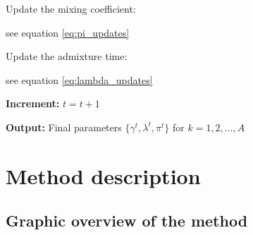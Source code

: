 \begin{algorithm}
\begin{algorithmic}[1]
        \State Update the mixing coefficient:
        
        \hspace{7mm} see equation \ref{eq:pi_updates}
        
        \State Update the admixture time:
        
        \hspace{7mm} see equation \ref{eq:lambda_updates}
            
    \EndFor
    

    \State \textbf{Increment:} $t = t + 1$
    

\State \textbf{Output:} Final parameters $\{\gamma^{t}, \lambda^{t}, \pi^{t}\}$ for $k = 1, 2, \dots, A$

\end{algorithmic}
\end{algorithm}

\section{Method description}
\label{sec:ch2-gb-method}
\subsection{Graphic overview of the method}



